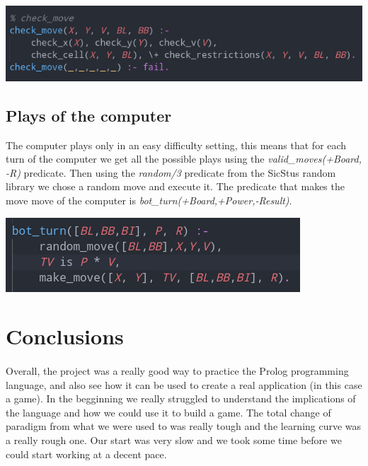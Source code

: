 \documentclass[a4paper]{article}
\begin{document}
\begin{center}
    \includegraphics[scale=0.4]{img/check_move.png}
\end{center}

\subsection{Plays of the computer} 
The computer plays only in an easy difficulty setting, this means that for each turn of the computer we get all the possible plays using 
the \textit{valid\_moves(+Board, -R)} predicate. Then using the \textit{random/3} predicate from the SicStus random library we chose a random 
move and execute it. The predicate that makes the move move of the computer is \textit{bot\_turn(+Board,+Power,-Result)}.

\begin{center}
    \includegraphics[scale=0.4]{img/bot_move.png}
\end{center}


\pagebreak
\section{Conclusions}

\paragraph{}
Overall, the project was a really good way to practice the Prolog programming language, and
also see how it can be used to create a real application (in this case a game). In the 
begginning we really struggled to understand the implications of the language and how 
we could use it to build a game. The total change of paradigm from what we were used to 
was really tough and the learning curve was a really rough one. Our start was very slow 
and we took some time before we could start working at a decent pace.
\end{document}
